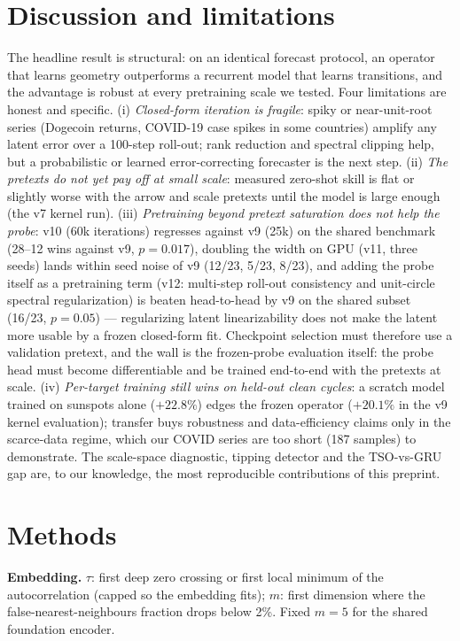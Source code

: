 \documentclass[11pt]{article}
\begin{document}
\section{Discussion and limitations}
\label{sec:disc}
The headline result is structural: on an identical forecast protocol, an
operator that learns geometry outperforms a recurrent model that learns
transitions, and the advantage is robust at every pretraining scale we
tested. Four
limitations are honest and specific. (i) \emph{Closed-form iteration is
fragile}: spiky or near-unit-root series (Dogecoin returns, COVID-19 case
spikes in some countries) amplify any latent error over a 100-step roll-out;
rank reduction and spectral clipping help, but a probabilistic or learned
error-correcting forecaster is the next step. (ii) \emph{The pretexts do not
yet pay off at small scale}: measured zero-shot skill is flat or slightly
worse with the arrow and scale pretexts until the model is large enough (the
v7 kernel run). (iii) \emph{Pretraining beyond pretext saturation does not
help the probe}: v10 (60k iterations) regresses against v9 (25k) on the
shared benchmark (28--12 wins against v9, $p=0.017$), doubling the
width on GPU (v11, three seeds) lands within seed noise of v9 (12/23,
5/23, 8/23), and adding the probe itself as a pretraining term (v12:
multi-step roll-out consistency and unit-circle spectral
regularization) is beaten head-to-head by v9 on the shared subset
(16/23, $p=0.05$) --- regularizing latent linearizability does not make
the latent more usable by a frozen closed-form fit. Checkpoint
selection must therefore use a validation pretext, and the wall is the
frozen-probe evaluation itself: the probe head must become
differentiable and be trained end-to-end with the pretexts at scale. (iv) \emph{Per-target training still wins on held-out clean
cycles}: a scratch model trained on sunspots alone ($+22.8\%$) edges the
frozen operator ($+20.1\%$ in the v9 kernel evaluation); transfer buys robustness and data-efficiency claims only in the
scarce-data regime, which our COVID series are too short (187 samples) to
demonstrate. The scale-space diagnostic, tipping detector and the TSO-vs-GRU
gap are, to our knowledge, the most reproducible contributions of this
preprint.

\section{Methods}
\label{sec:methods}
\textbf{Embedding.} $\tau$: first deep zero crossing or first local minimum of
the autocorrelation (capped so the embedding fits); $m$: first dimension
where the false-nearest-neighbours fraction drops below 2\%. Fixed $m=5$ for
the shared foundation encoder.
\end{document}
